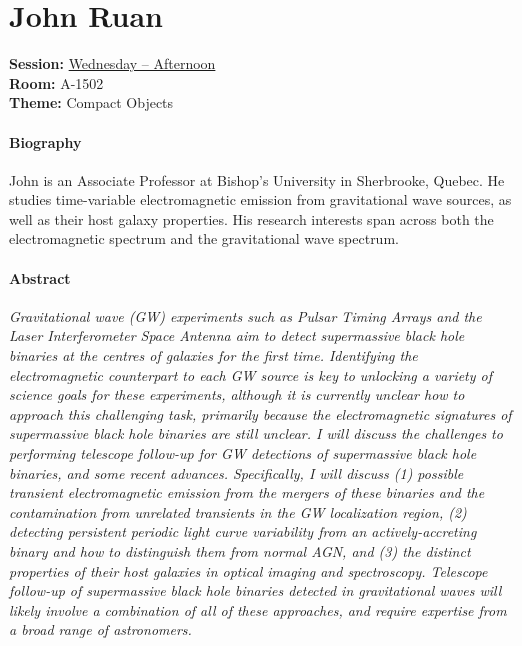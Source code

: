 \hypertarget{invited-john-ruan}{}
\label{invited-page-john-ruan}
\section{John Ruan}
\textbf{Session:} \hyperlink{schedule-wednesday-afternoon-a-1502}{Wednesday -- Afternoon}\\
\textbf{Room:} A-1502\\
\textbf{Theme:} Compact Objects\\

\paragraph{Biography}
{\sffamily
John is an Associate Professor at Bishop's University in Sherbrooke, Quebec. He studies time-variable electromagnetic emission from gravitational wave sources, as well as their host galaxy properties. His research interests span across both the electromagnetic spectrum and the gravitational wave spectrum.
}

\paragraph{Abstract}
{\itshape
Gravitational wave (GW) experiments such as Pulsar Timing Arrays and the Laser Interferometer Space Antenna aim to detect supermassive black hole binaries at the centres of galaxies for the first time. Identifying the electromagnetic counterpart to each GW source is key to unlocking a variety of science goals for these experiments, although it is currently unclear how to approach this challenging task, primarily because the electromagnetic signatures of supermassive black hole binaries are still unclear. I will discuss the challenges to performing telescope follow-up for GW detections of supermassive black hole binaries, and some recent advances. Specifically, I will discuss (1) possible transient electromagnetic emission from the mergers of these binaries and the contamination from unrelated transients in the GW localization region, (2) detecting persistent periodic light curve variability from an actively-accreting binary and how to distinguish them from normal AGN, and (3) the distinct properties of their host galaxies in optical imaging and spectroscopy. Telescope follow-up of supermassive black hole binaries detected in gravitational waves will likely involve a combination of all of these approaches, and require expertise from a broad range of astronomers.
}

